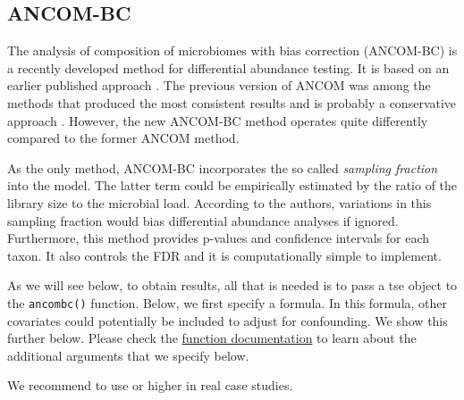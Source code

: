 \documentclass[
]{book}
\begin{document}
\hypertarget{ancom-bc}{%
\subsection{ANCOM-BC}\label{ancom-bc}}

The analysis of composition of microbiomes with bias correction
(ANCOM-BC) \citep{Das2020} is a recently developed method for differential
abundance testing. It is based on an earlier published approach
\citep{Mandal2015}. The previous version of ANCOM was among the methods
that produced the most consistent results and is probably a
conservative approach \citep{Nearing2022}. However, the new ANCOM-BC
method operates quite differently compared to the former ANCOM method.

As the only method, ANCOM-BC incorporates the so called \emph{sampling
fraction} into the model. The latter term could be empirically
estimated by the ratio of the library size to the microbial
load. According to the authors, variations in this sampling fraction
would bias differential abundance analyses if ignored. Furthermore,
this method provides p-values and confidence intervals for each
taxon. It also controls the FDR and it is computationally simple to
implement.

As we will see below, to obtain results, all that is needed is to pass
a tse object to the \texttt{ancombc()} function. Below, we first specify a
formula. In this formula, other covariates could potentially be
included to adjust for confounding. We show this further below.
Please check the \href{https://rdrr.io/github/FrederickHuangLin/ANCOMBC/man/ancombc.html}{function documentation}
to learn about the additional arguments that we specify below.

We recommend to use or higher in real case studies.
\end{document}
